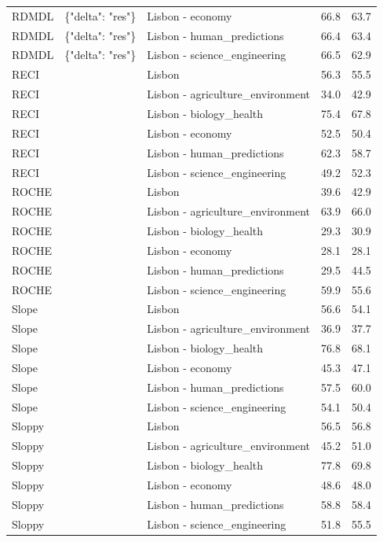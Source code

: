 \begin{tabular}{lllll}
RDMDL & \{"delta": "res"\} & Lisbon - economy & 66.8 & 63.7 \\
RDMDL & \{"delta": "res"\} & Lisbon - human\_predictions & 66.4 & 63.4 \\
RDMDL & \{"delta": "res"\} & Lisbon - science\_engineering & 66.5 & 62.9 \\
RECI &  & Lisbon & 56.3 & 55.5 \\
RECI &  & Lisbon - agriculture\_environment & 34.0 & 42.9 \\
RECI &  & Lisbon - biology\_health & 75.4 & 67.8 \\
RECI &  & Lisbon - economy & 52.5 & 50.4 \\
RECI &  & Lisbon - human\_predictions & 62.3 & 58.7 \\
RECI &  & Lisbon - science\_engineering & 49.2 & 52.3 \\
ROCHE &  & Lisbon & 39.6 & 42.9 \\
ROCHE &  & Lisbon - agriculture\_environment & 63.9 & 66.0 \\
ROCHE &  & Lisbon - biology\_health & 29.3 & 30.9 \\
ROCHE &  & Lisbon - economy & 28.1 & 28.1 \\
ROCHE &  & Lisbon - human\_predictions & 29.5 & 44.5 \\
ROCHE &  & Lisbon - science\_engineering & 59.9 & 55.6 \\
Slope &  & Lisbon & 56.6 & 54.1 \\
Slope &  & Lisbon - agriculture\_environment & 36.9 & 37.7 \\
Slope &  & Lisbon - biology\_health & 76.8 & 68.1 \\
Slope &  & Lisbon - economy & 45.3 & 47.1 \\
Slope &  & Lisbon - human\_predictions & 57.5 & 60.0 \\
Slope &  & Lisbon - science\_engineering & 54.1 & 50.4 \\
Sloppy &  & Lisbon & 56.5 & 56.8 \\
Sloppy &  & Lisbon - agriculture\_environment & 45.2 & 51.0 \\
Sloppy &  & Lisbon - biology\_health & 77.8 & 69.8 \\
Sloppy &  & Lisbon - economy & 48.6 & 48.0 \\
Sloppy &  & Lisbon - human\_predictions & 58.8 & 58.4 \\
Sloppy &  & Lisbon - science\_engineering & 51.8 & 55.5 \\
\bottomrule
\end{tabular}
